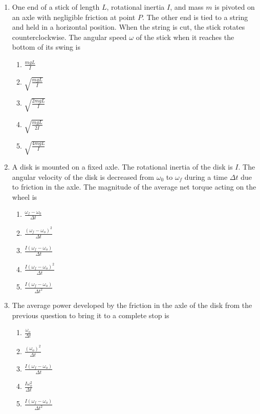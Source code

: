 \documentclass{../../oss-apphys}
\begin{document}
\begin{multicols}{2}
\begin{enumerate}[leftmargin=18pt]
  \item One end of a stick of length $L$, rotational inertia $I$, and mass $m$
    is pivoted on an axle with negligible friction at point $P$. The other end
    is tied to a string and held in a horizontal position. When the string is
    cut, the stick rotates counterclockwise. The angular speed $\omega$ of the
    stick when it reaches the bottom of its swing is
    \begin{center}
    \end{center}
    \begin{enumerate}[noitemsep,topsep=0pt,leftmargin=18pt,label=(\Alph*)]
    \item$\displaystyle\frac{mgL}{I}$
    \item$\displaystyle\sqrt{\frac{mgL}{I}}$
    \item$\displaystyle\sqrt{\frac{2mgL}{I}}$
    \item$\displaystyle\sqrt{\frac{mgL}{2I}}$
    \item$\displaystyle\sqrt{\frac{4mgL}{I}}$
    \end{enumerate}

  \item A disk is mounted on a fixed axle. The rotational inertia of the disk is
    $I$. The angular velocity of the disk is decreased from $\omega_0$ to
    $\omega_f$ during a time $\Delta t$ due to friction in the axle. The
    magnitude of the average net torque acting on the wheel is
    \begin{enumerate}[noitemsep,topsep=0pt,leftmargin=18pt,label=(\Alph*)]
    \item $\displaystyle\frac{\omega_f-\omega_0}{\Delta t}$
    \item $\displaystyle\frac{(\omega_f-\omega_o)^2}{\Delta t}$
    \item $\displaystyle\frac{I(\omega_f-\omega_o)}{\Delta t}$
    \item $\displaystyle\frac{I(\omega_f-\omega_o)^2}{\Delta t}$
    \item $\displaystyle\frac{I(\omega_f-\omega_o)}{\Delta t^2}$
    \end{enumerate}
    \columnbreak
    
  \item The average power developed by the friction in the axle of the disk
    from the previous question to bring it to a complete stop is
    \begin{enumerate}[noitemsep,topsep=0pt,leftmargin=18pt,label=(\Alph*)]
    \item $\displaystyle\frac{\omega_o}{\Delta t}$
    \item $\displaystyle\frac{(\omega_o)^2}{\Delta t}$
    \item $\displaystyle\frac{I(\omega_f-\omega_o)}{\Delta t}$
    \item $\displaystyle\frac{I\omega_o^2}{\Delta t}$
    \item $\displaystyle\frac{I(\omega_f-\omega_o)}{\Delta t^2}$
    \end{enumerate}
    

\end{enumerate}
\end{multicols}
\end{document}
